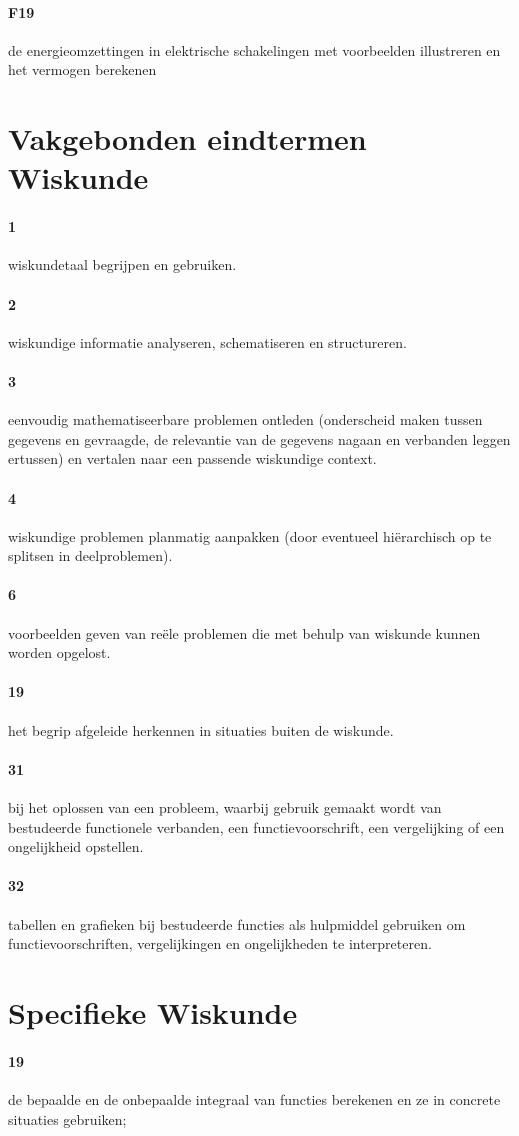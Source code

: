 \documentclass{article}
\begin{document}
		\paragraph*{F19} de energieomzettingen in elektrische schakelingen met voorbeelden illustreren en het vermogen berekenen
	\section{Vakgebonden eindtermen Wiskunde}
	\paragraph*{1} wiskundetaal begrijpen en gebruiken.
	\paragraph*{2} wiskundige informatie analyseren, schematiseren en structureren.
	\paragraph*{3} eenvoudig mathematiseerbare problemen ontleden (onderscheid maken tussen gegevens en gevraagde, de relevantie van de gegevens nagaan en verbanden leggen ertussen) en vertalen naar een passende wiskundige context.
	\paragraph*{4}	wiskundige problemen planmatig aanpakken (door eventueel hi\"erarchisch op te splitsen in deelproblemen).
	\paragraph*{6}		voorbeelden geven van re\"ele problemen die met behulp van wiskunde kunnen worden opgelost.
	\paragraph*{19}		het begrip afgeleide herkennen in situaties buiten de wiskunde.
	\paragraph*{31}		bij het oplossen van een probleem, waarbij gebruik gemaakt wordt van bestudeerde functionele verbanden, een functievoorschrift, een vergelijking of een ongelijkheid opstellen.
	\paragraph*{32}		tabellen en grafieken bij bestudeerde functies als hulpmiddel gebruiken om functievoorschriften, vergelijkingen en ongelijkheden te interpreteren.
	\section{Specifieke Wiskunde}
	\paragraph*{19}	de bepaalde en de onbepaalde integraal van functies berekenen en ze in concrete situaties gebruiken;
\end{document}
